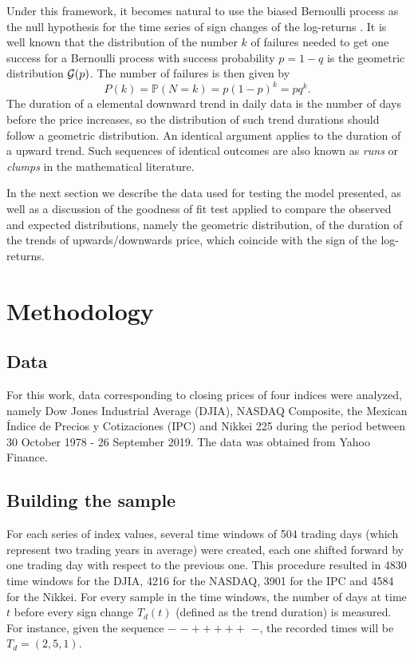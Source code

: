 \documentclass[a4paper]{jpconf}
\begin{document}
Under this framework, it becomes natural to use the biased Bernoulli process as the null hypothesis for the time series of sign changes of the log-returns \cite{scalasold}. It is well known that the distribution of the number $k$ of failures needed to get one success for a Bernoulli process with success probability $p=1-q$ is the geometric distribution ${\cal{G}}(p)$. The number of failures is then given by 
\begin{equation}
P(k)=\mathbb{P}(N=k) = p(1 - p)^{k} = pq^{k}.
\end{equation}
The duration of a elemental downward trend in daily data is the number of days before the price increases, so the distribution of such trend durations should follow a geometric distribution. An identical argument applies to the duration of a upward trend. Such sequences of identical outcomes are also known as {\em runs} or {\em clumps} in the mathematical literature.

In the next section we describe the data used for testing the model presented, as well as a discussion of the goodness of fit test applied to compare the observed and expected distributions, namely the  geometric distribution, of the duration of the trends of upwards/downwards price, which coincide with the sign of the log-returns.

\section{Methodology}
\label{methodology}
\subsection{Data}
For this work, data corresponding to closing prices of four indices were analyzed, namely Dow Jones Industrial Average (DJIA), NASDAQ Composite, the Mexican \'Indice de Precios y Cotizaciones (IPC) and Nikkei 225 during the period between 30 October 1978 - 26 September 2019. The data was obtained from Yahoo Finance.

\subsection{Building the sample}
For each series of index values, several time windows of 504 trading days (which represent two trading years in average) were created, each one shifted forward by one trading day with respect to the previous one. This procedure resulted in 4830 time windows for the DJIA, 4216 for the NASDAQ, 3901 for the IPC and 4584 for the Nikkei. For every sample in the time windows, the number of days at time $t$ before every sign change $T_d(t)$ (defined as the trend duration) is measured. For instance, given the sequence $-$ $ - + + + + + $ $-$, the recorded times will be $T_d = (2,5,1)$.
\end{document}
